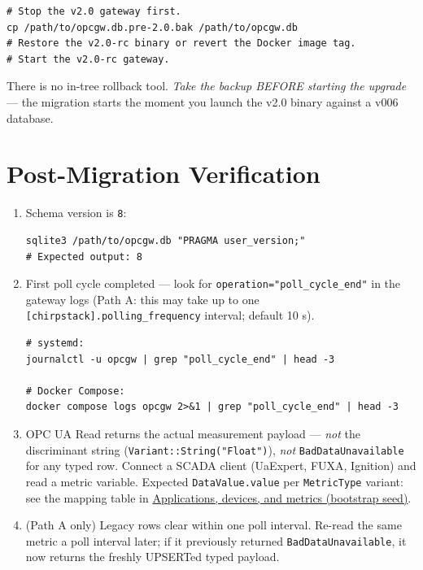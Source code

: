\begin{lstlisting}
# Stop the v2.0 gateway first.
cp /path/to/opcgw.db.pre-2.0.bak /path/to/opcgw.db
# Restore the v2.0-rc binary or revert the Docker image tag.
# Start the v2.0-rc gateway.
\end{lstlisting}

There is no in-tree rollback tool. \emph{Take the backup BEFORE starting the upgrade} --- the migration starts the moment you launch the v2.0 binary against a v006 database.

\section{Post-Migration Verification}\label{sec-upgrade-verification}

\begin{enumerate}
\def\labelenumi{\arabic{enumi}.}
\item
  Schema version is \texttt{8}:

\begin{lstlisting}
sqlite3 /path/to/opcgw.db "PRAGMA user_version;"
# Expected output: 8
\end{lstlisting}
\item
  First poll cycle completed --- look for \texttt{operation="poll\_cycle\_end"} in the gateway logs (Path A: this may take up to one \texttt{{[}chirpstack{]}.polling\_frequency} interval; default 10 s).

\begin{lstlisting}
# systemd:
journalctl -u opcgw | grep "poll_cycle_end" | head -3

# Docker Compose:
docker compose logs opcgw 2>&1 | grep "poll_cycle_end" | head -3
\end{lstlisting}
\item
  OPC UA Read returns the actual measurement payload --- \emph{not} the discriminant string (\texttt{Variant::String("Float")}), \emph{not} \texttt{BadDataUnavailable} for any typed row. Connect a SCADA client (UaExpert, FUXA, Ignition) and read a metric variable. Expected \texttt{DataValue.value} per \texttt{MetricType} variant: see the mapping table in \hyperref[sec-application-config]{Applications, devices, and metrics (bootstrap seed)}.
\item
  (Path A only) Legacy rows clear within one poll interval. Re-read the same metric a poll interval later; if it previously returned \texttt{BadDataUnavailable}, it now returns the freshly UPSERTed typed payload.
\end{enumerate}

